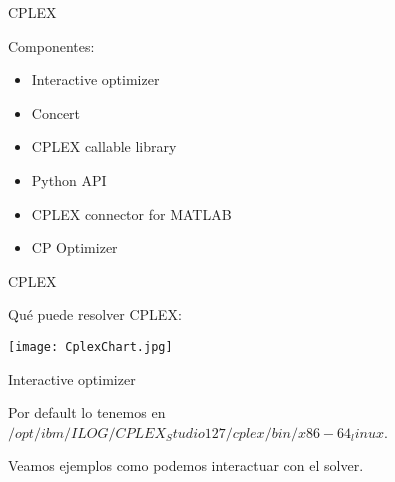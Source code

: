 \documentclass{beamer}
\begin{document}


\begin{frame}{CPLEX}


Componentes:
\begin{itemize}
 \item Interactive optimizer
 \item Concert
 \item CPLEX callable library
 \item Python API
 \item CPLEX connector for MATLAB
 \item CP Optimizer
\end{itemize}


\end{frame}


\begin{frame}{CPLEX}


Qu\'e puede resolver CPLEX:

\begin{center}
\texttt{[image: CplexChart.jpg]}
\end{center}



\end{frame}


\begin{frame}{Interactive optimizer}


Por default lo tenemos en $/opt/ibm/ILOG/CPLEX_Studio127/cplex/bin/x86-64_linux$.


\vspace{15pt}



Veamos ejemplos como podemos interactuar con el solver.





\end{frame}
\end{document}

